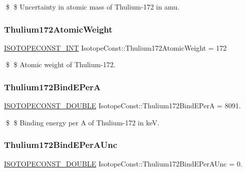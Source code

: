 \$ \$ Uncertainty in atomic mass of Thulium-\/172 in amu. \mbox{\label{group___isotope_const-_thulium-_tm172_ga8a2a6624e27cac3203a50ce6e9a23d0c}} 
\subsubsection{\texorpdfstring{Thulium172\+Atomic\+Weight}{Thulium172AtomicWeight}}
{\footnotesize\ttfamily \mbox{\hyperlink{group___isotope_const-_macros_ga5f18360b3e99483a35c32d789e62621c}{I\+S\+O\+T\+O\+P\+E\+C\+O\+N\+S\+T\+\_\+\+I\+NT}} Isotope\+Const\+::\+Thulium172\+Atomic\+Weight = 172}

\$ \$ Atomic weight of Thulium-\/172. \mbox{\label{group___isotope_const-_thulium-_tm172_ga67beb85eaf843e9ea9dde310f766ba76}} 
\subsubsection{\texorpdfstring{Thulium172\+Bind\+E\+PerA}{Thulium172BindEPerA}}
{\footnotesize\ttfamily \mbox{\hyperlink{group___isotope_const-_macros_ga8f45a7272ce02c0b4c65c44636ed719a}{I\+S\+O\+T\+O\+P\+E\+C\+O\+N\+S\+T\+\_\+\+D\+O\+U\+B\+LE}} Isotope\+Const\+::\+Thulium172\+Bind\+E\+PerA = 8091.}

\$ \$ Binding energy per A of Thulium-\/172 in keV. \mbox{\label{group___isotope_const-_thulium-_tm172_ga4ff49857454d2a453ffc3bd9235e2fcd}} 
\subsubsection{\texorpdfstring{Thulium172\+Bind\+E\+Per\+A\+Unc}{Thulium172BindEPerAUnc}}
{\footnotesize\ttfamily \mbox{\hyperlink{group___isotope_const-_macros_ga8f45a7272ce02c0b4c65c44636ed719a}{I\+S\+O\+T\+O\+P\+E\+C\+O\+N\+S\+T\+\_\+\+D\+O\+U\+B\+LE}} Isotope\+Const\+::\+Thulium172\+Bind\+E\+Per\+A\+Unc = 0.}

